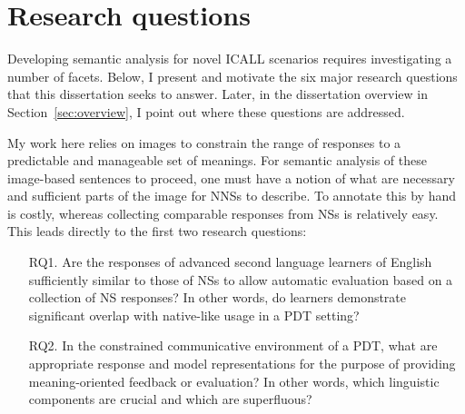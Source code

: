 \section{Research questions}
\label{sec:RQ}
Developing semantic analysis for novel ICALL scenarios requires investigating a number of facets. Below, I present and motivate the six major research questions that this dissertation seeks to answer. Later, in the dissertation overview in Section~\ref{sec:overview}, I point out where these questions are addressed.

My work here relies on images to constrain the range of responses to a predictable and manageable set of meanings. For semantic analysis of these image-based sentences to proceed, one must have a notion of what are necessary and sufficient parts of the image for NNSs to describe. To annotate this by hand is costly, whereas collecting comparable responses from NSs is relatively easy. This leads directly to the first two research questions:

\begin{itemize}

\item[RQ1.]{Are the responses of advanced second language learners of English sufficiently similar to those of NSs to allow automatic evaluation based on a collection of NS responses? In other words, do learners demonstrate significant overlap with native-like usage in a PDT setting?} %
\end{itemize}

\begin{itemize}
\item[RQ2.]{In the constrained communicative environment of a PDT, what are appropriate response and model representations for the purpose of providing meaning-oriented feedback or evaluation? In other words, which linguistic components are crucial and which are superfluous?}
\end{itemize}

